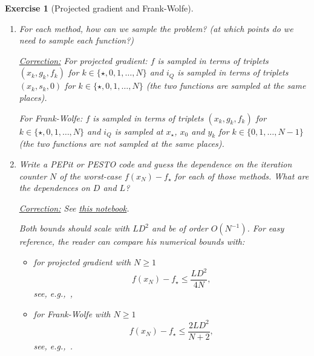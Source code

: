 \documentclass[11pt,a4paper]{article}
\newcommand{\pesto}{{PESTO }}
\newcommand{\pepit}{{PEPit }}
\newcommand{\correction}[1]{{{\color{blue}\underline{Correction:} #1}}}
\newcommand{\correction}[1]{}
\newtheorem{exercise}{Exercise}
\begin{document}
\begin{exercise}[Projected gradient and Frank-Wolfe]
\begin{enumerate}
{	}
	
	\item For each method, how can we sample the problem? (at which points do we need to sample each function?)
	
	\correction{For projected gradient: $f$ is sampled in terms of triplets $(x_k,g_k,f_k)$ for $k\in\{\star,0,1,\ldots,N\}$ and $i_Q$ is sampled in terms of triplets $(x_k,s_k,0)$ for $k\in\{\star,0,1,\ldots,N\}$ (the two functions are sampled at the same places).
	
	For Frank-Wolfe: $f$ is sampled in terms of triplets $(x_k,g_k,f_k)$ for $k\in\{\star,0,1,\ldots,N\}$ and $i_Q$ is sampled at $x_\star$, $x_0$ and $y_k$ for $k\in\{0,1,\ldots,N-1\}$ (the two functions are not sampled at the same places).
	}
	
	\item Write a \pepit or \pesto code and guess the dependence on the iteration counter $N$ of the worst-case $f(x_N)-f_\star$ for each of those methods. What are the dependences on $D$ and $L$?
	
	\correction{See \href{https://github.com/PerformanceEstimation/Learning-Performance-Estimation/tree/main/Codes/Jupyter/Exercise05.ipynb}{this notebook}.
	
	Both bounds should scale with $LD^2$ and be of order $O(N^{-1})$. For easy reference, the reader can compare his numerical bounds with:
	\begin{itemize}
	\item for projected gradient with $N\geqslant 1$
	\[ f(x_N)-f_\star\leqslant \frac{LD^2}{4N},\]
	see, e.g.,~\cite[Theorem 2.9]{drori2014contributions},
	\item for Frank-Wolfe with $N\geqslant 1$
	\[ f(x_N)-f_\star\leqslant \frac{2LD^2}{N+2}, \]
	see, e.g.,~\cite[Theorem 1]{jaggi2013revisiting}.
	\end{itemize}
	
	
	}
	\end{enumerate}
	\end{exercise}	
	
\end{document}
